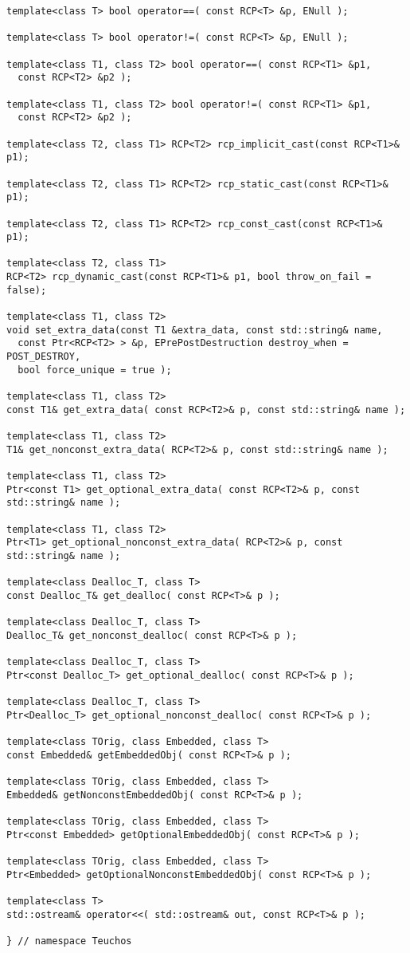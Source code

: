 \documentclass[pdf,ps2pdf,11pt]{SANDreport}
\begin{document}
{\scriptsize\begin{verbatim}
template<class T> bool operator==( const RCP<T> &p, ENull );

template<class T> bool operator!=( const RCP<T> &p, ENull );

template<class T1, class T2> bool operator==( const RCP<T1> &p1,
  const RCP<T2> &p2 );

template<class T1, class T2> bool operator!=( const RCP<T1> &p1,
  const RCP<T2> &p2 );

template<class T2, class T1> RCP<T2> rcp_implicit_cast(const RCP<T1>& p1);

template<class T2, class T1> RCP<T2> rcp_static_cast(const RCP<T1>& p1);

template<class T2, class T1> RCP<T2> rcp_const_cast(const RCP<T1>& p1);

template<class T2, class T1>
RCP<T2> rcp_dynamic_cast(const RCP<T1>& p1, bool throw_on_fail = false);

template<class T1, class T2>
void set_extra_data(const T1 &extra_data, const std::string& name,
  const Ptr<RCP<T2> > &p, EPrePostDestruction destroy_when = POST_DESTROY,
  bool force_unique = true );

template<class T1, class T2>
const T1& get_extra_data( const RCP<T2>& p, const std::string& name );

template<class T1, class T2>
T1& get_nonconst_extra_data( RCP<T2>& p, const std::string& name );

template<class T1, class T2>
Ptr<const T1> get_optional_extra_data( const RCP<T2>& p, const std::string& name );

template<class T1, class T2>
Ptr<T1> get_optional_nonconst_extra_data( RCP<T2>& p, const std::string& name );

template<class Dealloc_T, class T>
const Dealloc_T& get_dealloc( const RCP<T>& p );

template<class Dealloc_T, class T>
Dealloc_T& get_nonconst_dealloc( const RCP<T>& p );

template<class Dealloc_T, class T>
Ptr<const Dealloc_T> get_optional_dealloc( const RCP<T>& p );

template<class Dealloc_T, class T>
Ptr<Dealloc_T> get_optional_nonconst_dealloc( const RCP<T>& p );

template<class TOrig, class Embedded, class T>
const Embedded& getEmbeddedObj( const RCP<T>& p );

template<class TOrig, class Embedded, class T>
Embedded& getNonconstEmbeddedObj( const RCP<T>& p );

template<class TOrig, class Embedded, class T>
Ptr<const Embedded> getOptionalEmbeddedObj( const RCP<T>& p );

template<class TOrig, class Embedded, class T>
Ptr<Embedded> getOptionalNonconstEmbeddedObj( const RCP<T>& p );

template<class T>
std::ostream& operator<<( std::ostream& out, const RCP<T>& p );

} // namespace Teuchos
\end{verbatim}}
\end{document}
